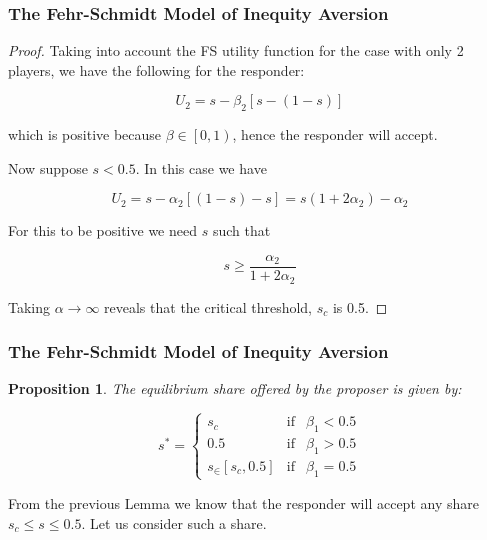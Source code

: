 \documentclass{beamer}
\newtheorem{prop}{Proposition}
\begin{document}
\begin{frame}
		\frametitle{The Fehr-Schmidt Model of Inequity Aversion}
	\begin{proof}
	Taking into account the FS utility function for the case with only 2 players, we have the following for the responder:
	
	\begin{equation*}
	U_2 = s - \beta_2 \left[s - \left(1-s\right)\right]
	\end{equation*}
	
	which is positive because $\beta \in \left[0,1\right)$, hence the responder will accept.
	
	Now suppose $s<0.5$. In this case we have
	
	\begin{equation*}
	U_2 = s - \alpha_2 \left[\left(1-s\right) - s  \right] = s(1+2\alpha_2)-\alpha_2
	\end{equation*}
	
	For this to be positive we need $s$ such that 
	
	\begin{equation*}
	s \geq \frac{\alpha_2}{1+2\alpha_2}
	\end{equation*}
	
	Taking $\alpha \rightarrow \infty$ reveals that the critical threshold, $s_c$ is 0.5.
	
	\end{proof}
		
\end{frame}
	
\begin{frame}
	\frametitle{The Fehr-Schmidt Model of Inequity Aversion}

	\begin{prop}
	The equilibrium share offered by the proposer is given by:
	
		\begin{equation*}
			s^* =\left\{\begin{matrix}
			s_c & \text{if} & \beta_1 <0.5\\ 
			0.5 & \text{if}&\beta_1 >0.5\\ 
			s_ \in \left[s_c,0.5 \right] & \text{if}&\beta_1 =0.5
			\end{matrix}\right.
		\end{equation*}	
	\end{prop}

From the previous Lemma we know that the responder will accept any share $s_c \leq s \leq 0.5$.  Let us consider such a share.

\end{frame}	
\end{document}

